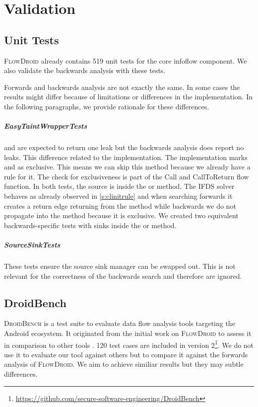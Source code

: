 \documentclass[../draft.tex]{subfiles}
\begin{document}
    \chapter{Validation}
    \section{Unit Tests}
    \textsc{FlowDroid} already contains 519 unit tests for the core infoflow component. We also validate the backwards analysis with these tests.

    Forwards and backwards analysis are not exactly the same. In some cases the results might differ because of limitations or differences in the implementation. In the following paragraphs, we provide rationale for these differences.

    \paragraph{EasyTaintWrapperTests}  and  are expected to return one leak but the backwards analysis does report no leaks. This difference related to the  implementation. The implementation marks  and  as exclusive. This means we can skip this method because we already have a rule for it. The check for exclusiveness is part of the Call and CallToReturn flow function. In both tests, the source is inside the  or  method. The IFDS solver behaves as already observed in \autoref{s:clinitrule} and when searching forwards it creates a return edge returning from the method while backwards we do not propagate into the method because it is exclusive.
    We created two equivalent backwards-specific tests with sinks inside the  or  method.
    
    \paragraph{SourceSinkTests} These tests ensure the source sink manager can be swapped out. This is not relevant for the correctness of the backwards search and therefore are ignored.

    

    \section{DroidBench}
    \textsc{DroidBench} is a test suite to evaluate data flow analysis tools targeting the Android ecosystem. It originated from the initial work on \textsc{FlowDroid} to assess it in comparison to other tools \cite{Arzt2014}. 120 test cases are included in version 2\footnote{\url{https://github.com/secure-software-engineering/DroidBench}}.
    We do not use it to evaluate our tool against others but to compare it against the forwards analysis of \textsc{FlowDroid}. We aim to achieve similiar results but they may subtle differences.
    
\end{document}
